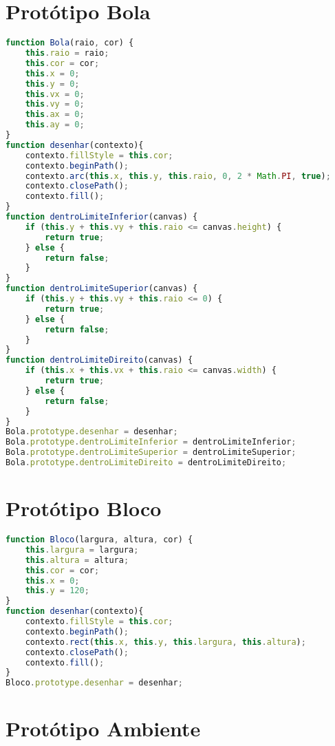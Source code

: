 \documentclass[12pt,a4paper,oneside]{article}
\begin{document}
\section*{Protótipo Bola}

\begin{lstlisting}[language=JavaScript]
function Bola(raio, cor) {
	this.raio = raio;
	this.cor = cor;
	this.x = 0;
	this.y = 0;
	this.vx = 0;
	this.vy = 0;
	this.ax = 0;
	this.ay = 0;
}
function desenhar(contexto){
	contexto.fillStyle = this.cor;
	contexto.beginPath();
	contexto.arc(this.x, this.y, this.raio, 0, 2 * Math.PI, true);
	contexto.closePath();
	contexto.fill();
}
function dentroLimiteInferior(canvas) {
	if (this.y + this.vy + this.raio <= canvas.height) {
		return true;
	} else {
		return false;
	}
}
function dentroLimiteSuperior(canvas) {
	if (this.y + this.vy + this.raio <= 0) {
		return true;
	} else {
		return false;
	}
}
function dentroLimiteDireito(canvas) {
	if (this.x + this.vx + this.raio <= canvas.width) {
		return true;
	} else {
		return false;
	}
}
Bola.prototype.desenhar = desenhar;
Bola.prototype.dentroLimiteInferior = dentroLimiteInferior;
Bola.prototype.dentroLimiteSuperior = dentroLimiteSuperior;
Bola.prototype.dentroLimiteDireito = dentroLimiteDireito;
\end{lstlisting}

\section*{Protótipo Bloco}

\begin{lstlisting}[language=JavaScript]
function Bloco(largura, altura, cor) {
	this.largura = largura;
	this.altura = altura;
	this.cor = cor;
	this.x = 0;
	this.y = 120;
}
function desenhar(contexto){    
	contexto.fillStyle = this.cor;
	contexto.beginPath();    
	contexto.rect(this.x, this.y, this.largura, this.altura);
	contexto.closePath();
	contexto.fill();
}
Bloco.prototype.desenhar = desenhar;
\end{lstlisting}

\section*{Protótipo Ambiente}
\end{document}
